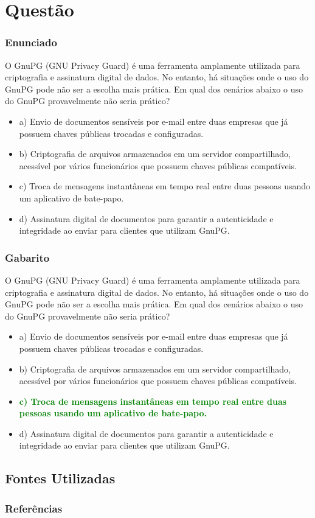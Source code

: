 \documentclass[aspectratio=169]{beamer}
\begin{document}
\section{Questão}
\begin{frame}
	\frametitle{Enunciado}
	O GnuPG (GNU Privacy Guard) é uma ferramenta amplamente utilizada para criptografia e assinatura digital de dados. No entanto, há situações onde o uso do GnuPG pode não ser a escolha mais prática. Em qual dos cenários abaixo o uso do GnuPG provavelmente não seria prático?
	\begin{itemize}
		\item a) Envio de documentos sensíveis por e-mail entre duas empresas que já possuem chaves públicas trocadas e configuradas.
		\item b) Criptografia de arquivos armazenados em um servidor compartilhado, acessível por vários funcionários que possuem chaves públicas compatíveis.
		\item c) Troca de mensagens instantâneas em tempo real entre duas pessoas usando um aplicativo de bate-papo.
		\item d) Assinatura digital de documentos para garantir a autenticidade e integridade ao enviar para clientes que utilizam GnuPG.
	\end{itemize}
\end{frame}
\begin{frame}
	\frametitle{Gabarito}
	O GnuPG (GNU Privacy Guard) é uma ferramenta amplamente utilizada para criptografia e assinatura digital de dados. No entanto, há situações onde o uso do GnuPG pode não ser a escolha mais prática. Em qual dos cenários abaixo o uso do GnuPG provavelmente não seria prático?
	\begin{itemize}
		\item a) Envio de documentos sensíveis por e-mail entre duas empresas que já possuem chaves públicas trocadas e configuradas.
		\item b) Criptografia de arquivos armazenados em um servidor compartilhado, acessível por vários funcionários que possuem chaves públicas compatíveis.
		\item \textcolor{green}{\textbf{c) Troca de mensagens instantâneas em tempo real entre duas pessoas usando um aplicativo de bate-papo.}}
		\item d) Assinatura digital de documentos para garantir a autenticidade e integridade ao enviar para clientes que utilizam GnuPG.
	\end{itemize}
\end{frame}
\subsection{Fontes Utilizadas}
\begin{frame}
	\frametitle{Referências}
	\printbibliography
\end{frame}
\end{document}
